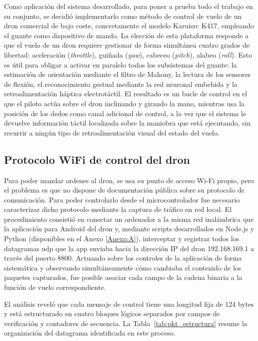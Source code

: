 \documentclass[12pt]{article}
\begin{document}
Como aplicación del sistema desarrollado, para poner a prueba todo el trabajo en su conjunto, se decidió implementarlo como método de control de vuelo de un dron comercial de bajo coste, concretamente el modelo Karuisrc K417, empleando el guante como dispositivo de mando. La elección de esta plataforma responde a que el vuelo de un dron requiere gestionar de forma simultánea cuatro grados de libertad: aceleración (\textit{throttle}), guiñada (\textit{yaw}), cabeceo (\textit{pitch}), alabeo (\textit{roll}). Esto es útil para obligar a activar en paralelo todos los subsistemas del guante: la estimación de orientación mediante el filtro de Mahony, la lectura de los sensores de flexión, el reconocimiento gestual mediante la red neuronal embebida y la retroalimentación háptica electrotáctil. El resultado es un bucle de control en el que el piloto actúa sobre el dron inclinando y girando la mano, mientras usa la posición de los dedos como canal adicional de control, a la vez que el sistema le devuelve información táctil localizada sobre la maniobra que está ejecutando, sin recurrir a ningún tipo de retroalimentación visual del estado del vuelo.

\subsection{Protocolo WiFi de control del dron}
\label{sec:dron_protocolo}

Para poder mandar ordenes al dron, se usa su punto de acceso Wi-Fi propio, pero el problema es que no dispone de documentación pública sobre su protocolo de comunicación. Para poder controlarlo desde el microcontrolador fue necesario caracterizar dicho protocolo mediante la captura de tráfico en red local. El procedimiento consistió en conectar un ordenador a la misma red inalámbrica que la aplicación para Android del dron y, mediante scripts desarrollados en Node.js y Python (disponibles en el Anexo \ref{Anexo:A}), interceptar y registrar todos los datagramas \gls{udp} que la app enviaba hacia la dirección IP del dron 192.168.169.1 a través del puerto 8800. Actuando sobre los controles de la aplicación de forma sistemática y observando simultáneamente cómo cambiaba el contenido de los paquetes capturados, fue posible asociar cada campo de la cadena binaria a la función de vuelo correspondiente.

El análisis reveló que cada mensaje de control tiene una longitud fija de 124 bytes y está estructurado en cuatro bloques lógicos separados por campos de verificación y contadores de secuencia. La Tabla~\ref{tab:pkt_estructura} resume la organización del datagrama identificada en este proceso.
\end{document}
